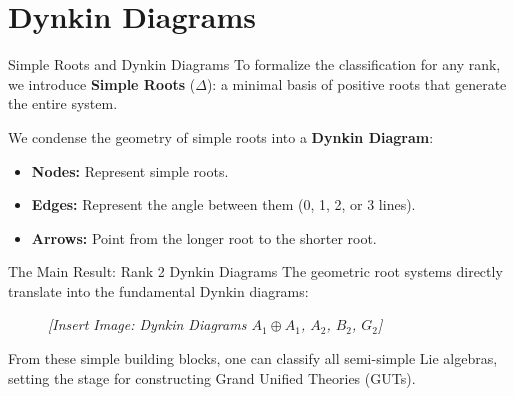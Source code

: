 \section{Dynkin Diagrams}

\begin{frame}{Simple Roots and Dynkin Diagrams}
    To formalize the classification for any rank, we introduce \textbf{Simple Roots} ($\Delta$): a minimal basis of positive roots that generate the entire system.

    \vspace{0.5cm}
    We condense the geometry of simple roots into a \textbf{Dynkin Diagram}:
    \begin{itemize}
        \item \textbf{Nodes:} Represent simple roots.
        \item \textbf{Edges:} Represent the angle between them (0, 1, 2, or 3 lines).
        \item \textbf{Arrows:} Point from the longer root to the shorter root.
    \end{itemize}

    \vfill
    \hyperlink{backup_simpleroots}{}
    \hyperlink{backup_dynkin}{}
\end{frame}

\begin{frame}{The Main Result: Rank 2 Dynkin Diagrams}
    The geometric root systems directly translate into the fundamental Dynkin diagrams:

    \vspace{0.5cm}
    \begin{figure}
        \centering
        \textit{[Insert Image: Dynkin Diagrams $A_1 \oplus A_1$, $A_2$, $B_2$, $G_2$]}
    \end{figure}

    \vspace{0.5cm}
    From these simple building blocks, one can classify all semi-simple Lie algebras, setting the stage for constructing Grand Unified Theories (GUTs).
\end{frame}


